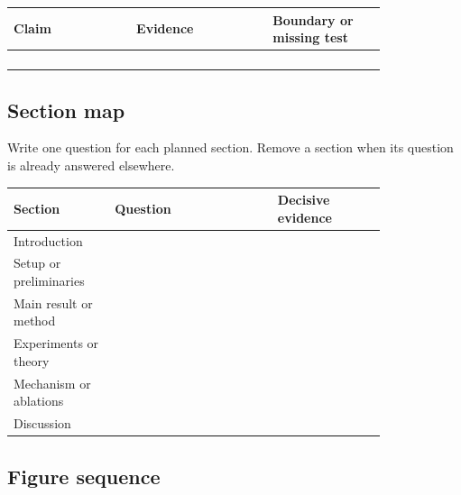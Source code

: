 \renewcommand{\arraystretch}{2.0}
\begin{center}
\begin{tabular}{p{0.27\linewidth}p{0.30\linewidth}p{0.25\linewidth}}
\toprule
\textbf{Claim} & \textbf{Evidence} & \textbf{Boundary or missing test} \\
\midrule
 & & \\
 & & \\
 & & \\
 & & \\
\bottomrule
\end{tabular}
\end{center}
\renewcommand{\arraystretch}{1.0}

\subsection{Section map}

Write one question for each planned section. Remove a section when its question
is already answered elsewhere.

\renewcommand{\arraystretch}{1.8}
\begin{center}
\begin{tabular}{p{0.22\linewidth}p{0.36\linewidth}p{0.24\linewidth}}
\toprule
\textbf{Section} & \textbf{Question} & \textbf{Decisive evidence} \\
\midrule
Introduction & & \\
Setup or preliminaries & & \\
Main result or method & & \\
Experiments or theory & & \\
Mechanism or ablations & & \\
Discussion & & \\
\bottomrule
\end{tabular}
\end{center}
\renewcommand{\arraystretch}{1.0}

\subsection{Figure sequence}

